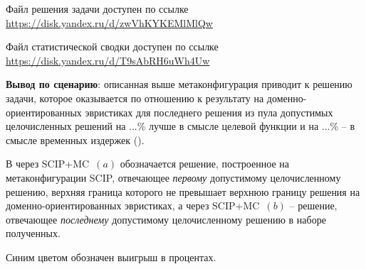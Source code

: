 \documentclass[%
	11pt,
	a4paper,
	utf8,
		]{article}
\begin{document}
Файл решения задачи доступен по ссылке \url{https://disk.yandex.ru/d/zwVhKYKEMlMlQw}

Файл статистической сводки доступен по ссылке \url{https://disk.yandex.ru/d/T9sAbRH6uWh4Uw}

\vspace*{3mm}
\textbf{Вывод по сценарию}: описанная выше метаконфигурация приводит к решению задачи, которое оказывается по отношению к результату на доменно-ориентированных эвристиках для последнего решения из пула допустимых целочисленных решений на ...\% лучше в смысле целевой функции и на ...\% -- в смысле временных издержек ().

В   через SCIP+MC~$ (a) $ обозначается решение, построенное на метаконфигурации SCIP, отвечающее \emph{первому} допустимому целочисленному решению, верхняя граница которого не превышает верхнюю границу решения на доменно-ориентированных эвристиках, а через SCIP+MC~$ (b) $ -- решение, отвечающее \emph{последнему} допустимому целочисленному решению в наборе полученных.

Синим цветом обозначен выигрыш в процентах.
\end{document}
